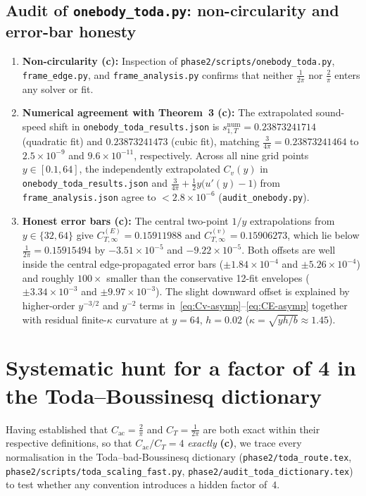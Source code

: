 \documentclass[11pt,a4paper]{article}
\newcommand{\claim}[1]{\textbf{(#1)}}
\begin{document}
\subsection{Audit of \texttt{onebody\_toda.py}: non-circularity and error-bar honesty}

\begin{enumerate}
  \item \textbf{Non-circularity \claim{c}:} Inspection of \texttt{phase2/scripts/onebody\_toda.py},
  \texttt{frame\_edge.py}, and \texttt{frame\_analysis.py} confirms that neither $\frac{1}{2\pi}$ nor
  $\frac{2}{\pi}$ enters any solver or fit.
  \item \textbf{Numerical agreement with Theorem~3 \claim{c}:}
  The extrapolated sound-speed shift in \texttt{onebody\_toda\_results.json} is
  $s_{1,T}^{\mathrm{num}} = 0.23873241714$ (quadratic fit) and $0.23873241473$ (cubic fit), matching
  $\frac{3}{4\pi} = 0.23873241464$ to $2.5\times 10^{-9}$ and $9.6\times 10^{-11}$, respectively.
  Across all nine grid points $y\in[0.1,64]$, the independently extrapolated $C_v(y)$ in
  \texttt{onebody\_toda\_results.json} and $\frac{3}{4\pi} + \frac{1}{2}y\bigl(u'(y)-1\bigr)$ from
  \texttt{frame\_analysis.json} agree to $<2.8\times 10^{-6}$ (\texttt{audit\_onebody.py}).
  \item \textbf{Honest error bars \claim{c}:}
  The central two-point $1/y$ extrapolations from $y\in\{32,64\}$ give
  $C_{T,\infty}^{(E)} = 0.15911988$ and $C_{T,\infty}^{(v)} = 0.15906273$, which lie below
  $\frac{1}{2\pi} = 0.15915494$ by $-3.51\times 10^{-5}$ and $-9.22\times 10^{-5}$.
  Both offsets are well inside the central edge-propagated error bars
  ($\pm 1.84\times 10^{-4}$ and $\pm 5.26\times 10^{-4}$) and roughly $100\times$ smaller than the
  conservative 12-fit envelopes ($\pm 3.34\times 10^{-3}$ and $\pm 9.97\times 10^{-3}$).
  The slight downward offset is explained by higher-order $y^{-3/2}$ and $y^{-2}$ terms in~\eqref{eq:Cv-asymp}--\eqref{eq:CE-asymp}
  together with residual finite-$\kappa$ curvature at $y=64$, $h=0.02$ ($\kappa = \sqrt{yh/b} \approx 1.45$).
\end{enumerate}

\section{Systematic hunt for a factor of 4 in the Toda--Boussinesq dictionary}

Having established that $C_{\mathrm{ac}} = \frac{2}{\pi}$ and $C_T = \frac{1}{2\pi}$ are both exact within
their respective definitions, so that $C_{\mathrm{ac}}/C_T = 4$ \emph{exactly} \claim{c}, we trace every
normalisation in the Toda--bad-Boussinesq dictionary (\texttt{phase2/toda\_route.tex},
\texttt{phase2/scripts/toda\_scaling\_fast.py}, \texttt{phase2/audit\_toda\_dictionary.tex}) to test whether
any convention introduces a hidden factor of~$4$.
\end{document}
